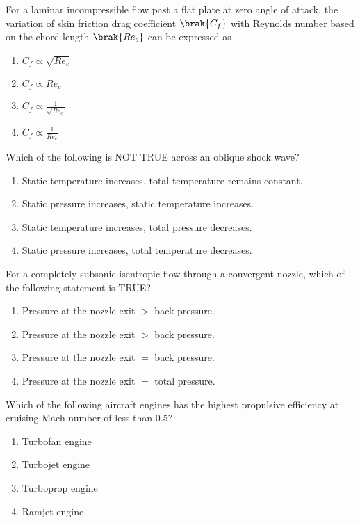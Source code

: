 \iffalse
\chapter{2016}
\author{AI24BTECH11011}
\section{ae}
\fi


\item For a laminar incompressible flow past a flat plate at zero angle of attack, the variation of skin friction drag coefficient $\brak{C_f}$ with Reynolds number based on the chord length $\brak{Re_c}$ can be expressed as
\begin{enumerate}
    \item ${C_f} \propto \sqrt{Re_c}$
    \item $C_f \propto Re_c$
    \item $C_f \propto \frac{1}{\sqrt{Re_c}}$
    \item $C_f \propto \frac{1}{Re_c}$
\end{enumerate}

\item Which of the following is NOT TRUE across an oblique shock wave?
\begin{enumerate}
    \item Static temperature increases, total temperature remains constant.
    \item Static pressure increases, static temperature increases.
    \item Static temperature increases, total pressure decreases.
    \item Static pressure increases, total temperature decreases.
\end{enumerate}

\item For a completely subsonic isentropic flow through a convergent nozzle, which of the following statement is TRUE?
\begin{enumerate}
    \item Pressure at the nozzle exit $>$ back pressure.
    \item Pressure at the nozzle exit $>$ back pressure.
    \item Pressure at the nozzle exit $=$ back pressure.
    \item Pressure at the nozzle exit $=$ total pressure.
\end{enumerate}

\item Which of the following aircraft engines has the highest propulsive efficiency at cruising Mach number of less than 0.5?
\begin{enumerate}
    \item Turbofan engine
    \item Turbojet engine
    \item Turboprop engine
    \item Ramjet engine
\end{enumerate}

